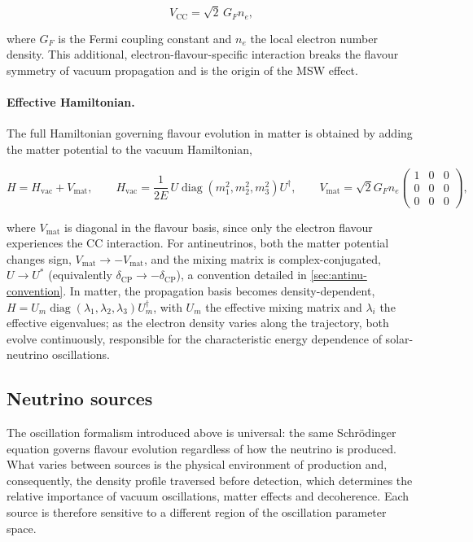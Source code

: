 \begin{equation}
  V_{\mathrm{CC}} = \sqrt{2}\,G_F n_e,
\end{equation}

where \(G_F\) is the Fermi coupling constant and \(n_e\) the local electron number density. This additional, electron-flavour-specific interaction breaks the flavour symmetry of vacuum propagation and is the origin of the MSW effect.

\paragraph{Effective Hamiltonian.}
The full Hamiltonian governing flavour evolution in matter is obtained by adding the matter potential to the vacuum Hamiltonian,

\begin{equation}
  H = H_{\mathrm{vac}} + V_{\mathrm{mat}},
  \qquad
  H_{\mathrm{vac}} = \frac{1}{2E}\,U\operatorname{diag}\!\left(m_1^2,m_2^2,m_3^2\right)U^{\dagger},
  \qquad
  V_{\mathrm{mat}} =
  \sqrt{2}G_F n_e
  \begin{pmatrix}
    1 & 0 & 0\\
    0 & 0 & 0\\
    0 & 0 & 0
  \end{pmatrix},
\end{equation}

where \(V_{\mathrm{mat}}\) is diagonal in the flavour basis, since only the electron flavour experiences the CC interaction. For antineutrinos, both the matter potential changes sign, \(V_{\mathrm{mat}}\to-V_{\mathrm{mat}}\), and the mixing matrix is complex-conjugated, \(U\to U^{*}\) (equivalently \(\delta_{\mathrm{CP}}\to-\delta_{\mathrm{CP}}\)), a convention detailed in \cref{sec:antinu-convention}. In matter, the propagation basis becomes density-dependent, \(H=U_m\operatorname{diag}(\lambda_1,\lambda_2,\lambda_3)U_m^\dagger\), with \(U_m\) the effective mixing matrix and \(\lambda_i\) the effective eigenvalues; as the electron density varies along the trajectory, both evolve continuously, responsible for the characteristic energy dependence of solar-neutrino oscillations.

\subsection{Neutrino sources}

The oscillation formalism introduced above is universal: the same Schr\"odinger equation governs flavour evolution regardless of how the neutrino is produced. What varies between sources is the physical environment of production and, consequently, the density profile traversed before detection, which determines the relative importance of vacuum oscillations, matter effects and decoherence. Each source is therefore sensitive to a different region of the oscillation parameter space.

